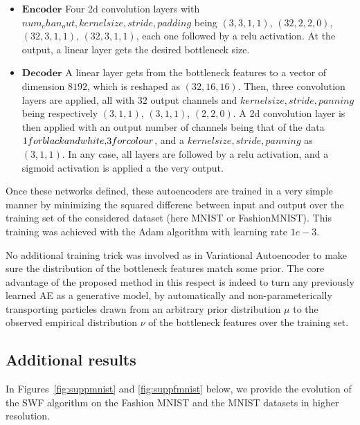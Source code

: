 \begin{itemize}
  \item $\textbf{Encoder}$ Four 2d convolution layers with \(num_chan_out, kernel size, stride, padding\) being $(3,3,1,1)$, $(32,2,2,0)$, $(32,3,1,1)$, $(32, 3,1,1)$, each one followed by a relu activation. At the output, a linear layer gets the desired bottleneck size.

  \item $\textbf{Decoder}$ A linear layer gets from the bottleneck features to a vector of dimension $8192$, which is reshaped as $(32, 16,16)$. Then, three convolution layers are applied, all with $32$ output channels and \(kernel size, stride, panning\) being respectively $(3,1,1)$, $(3,1,1)$, $(2,2,0)$. A 2d convolution layer is then applied with an output number of channels being that of the data \($1$ for black and white, $3$ for colour\), and a \(kernel size, stride, panning\) as $(3,1,1)$. In any case, all layers are followed by a relu activation, and a sigmoid activation is applied a the very output.
\end{itemize}

Once these networks defined, these autoencoders are trained in a very simple manner by minimizing the squared differenc between input and output over the training set of the considered dataset (here MNIST or FashionMNIST). This training was achieved with the Adam algorithm \cite{kingma2014adam} with learning rate $1e-3$.

No additional training trick was involved as in Variational Autoencoder \cite{kingma2013VAE} to make sure the distribution of the bottleneck features match some prior. The core advantage of the proposed method in this respect is indeed to turn any previously learned AE as a generative model, by automatically and non-parameterically transporting particles drawn from an arbitrary prior distribution $\mu$ to the observed empirical distribution $\nu$ of the bottleneck features over the training set.

\subsection{Additional results}

In Figures~\ref{fig:suppmnist} and \ref{fig:suppfmnist} below, we provide the evolution of the SWF algorithm on the Fashion MNIST and the MNIST datasets in higher resolution.

\newcommand{\picwidth}{0.15}%


